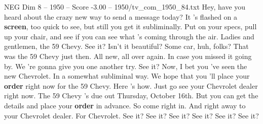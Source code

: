 \begin{textsample}{NEG Dim 8 – 1950 – Score -3.00 – 1950/tv\_com\_1950\_84.txt}  \label{ex:f8_neg_082}
Hey, have you heard about the crazy new way to send a message today?
It 's flashed on a \textbf{screen}, too quick to see, but still you get it subliminally.
Put on your specs, pull up your chair, and see if you can see what 's coming through the air.
Ladies and gentlemen, the 59 Chevy.
See it?
Isn't it beautiful?
Some car, huh, folks?
That was the 59 Chevy just then.
All new, all over again.
In case you missed it going by.
We 're gonna give you one another try.
See it?
Now, I bet you 've seen the new Chevrolet.
In a somewhat subliminal way.
We hope that you 'll place your \textbf{order} right now for the 59 Chevy.
Here 's how.
Just go see your Chevrolet dealer right now.
The 59 Chevy 's due out Thursday, October 16th.
But you can get the details and place your \textbf{order} in advance.
So come right in.
And right away to your Chevrolet dealer.
For Chevrolet.
See it?
See it?
See it?
See it?
See it?
See it?

\end{textsample}
